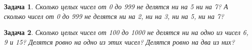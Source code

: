 \documentclass[12pt, a4paper]{article}
\newtheorem{problem}{Задача}
\begin{document}
\begin{problem}
Сколько целых чисел от 0 до 999 не делятся ни на 5 ни на 7? А сколько чисел от 0 до 999 не делятся ни на 2, ни на 3, ни на 5, ни на 7?
\begin{sol}

\end{sol}
\end{problem}



\begin{problem}
Сколько целых чисел от 100 до 1000 не делятся ни на одно из чисел 6, 9 и 15? Делятся ровно на одно из этих чисел? Делятся ровно на два из них? 
\begin{sol}

\end{sol}
\end{problem}






% 
\end{document}
